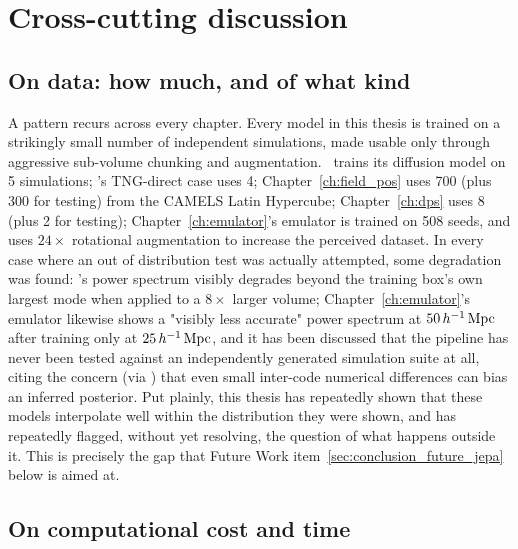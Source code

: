 \section{Cross-cutting discussion}
\label{sec:conclusion_discussion}

\subsection{On data: how much, and of what kind}
\label{sec:conclusion_disc_data}

A pattern recurs across every chapter. Every model in this thesis is trained on a strikingly small number of independent simulations, made usable only through aggressive sub-volume chunking and augmentation. \LODI\ trains its diffusion model on 5 simulations; \FOLD's TNG-direct case uses 4; Chapter~\ref{ch:field_pos} uses 700 (plus 300 for testing) from the CAMELS Latin Hypercube; Chapter~\ref{ch:dps} uses 8 (plus 2 for testing); Chapter~\ref{ch:emulator}'s emulator is trained on 508 seeds, and uses $24\times$ rotational augmentation to increase the perceived dataset. In every case where an out of distribution test was actually attempted, some degradation was found: \FOLD's power spectrum visibly degrades beyond the training box's own largest mode when applied to a $8\times$ larger volume; Chapter~\ref{ch:emulator}'s emulator likewise shows a "visibly less accurate" power spectrum at $50\,h^{-1}\,\mathrm{Mpc}$ after training only at $25\,h^{-1}\,\mathrm{Mpc}$, and it has been discussed that the pipeline has never been tested against an independently generated simulation suite at all, citing the concern (via \citealt{Bayer_2025}) that even small inter-code numerical differences can bias an inferred posterior. Put plainly, this thesis has repeatedly shown that these models interpolate well within the distribution they were shown, and has repeatedly flagged, without yet resolving, the question of what happens outside it. This is precisely the gap that Future Work item~\ref{sec:conclusion_future_jepa} below is aimed at.

\subsection{On computational cost and time}
\label{sec:conclusion_disc_compute}

